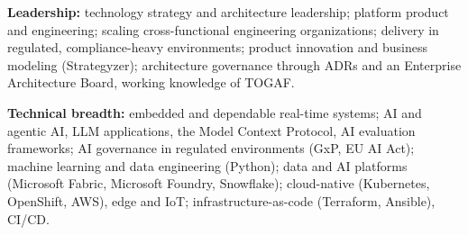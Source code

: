 
\begin{cvparagraph}
\textbf{Leadership:} technology strategy and architecture leadership; platform product and engineering; scaling cross-functional engineering organizations; delivery in regulated, compliance-heavy environments; product innovation and business modeling (Strategyzer); architecture governance through ADRs and an Enterprise Architecture Board, working knowledge of TOGAF.

\textbf{Technical breadth:} embedded and dependable real-time systems; AI and agentic AI, LLM applications, the Model Context Protocol, AI evaluation frameworks; AI governance in regulated environments (GxP, EU AI Act); machine learning and data engineering (Python); \ifmicrosoft data and AI platforms (Microsoft Fabric, Microsoft Foundry, Snowflake); \fi cloud-native (Kubernetes, OpenShift, AWS), edge and IoT; infrastructure-as-code (Terraform, Ansible), CI/CD.
\end{cvparagraph}
